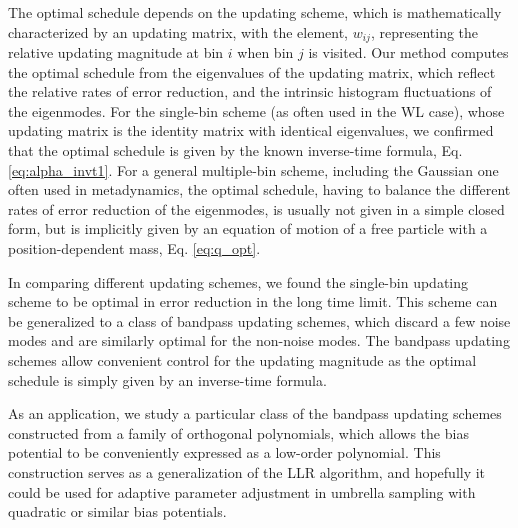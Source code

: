 \documentclass[reprint, superscriptaddress, floatfix]{revtex4-1}
\begin{document}
The optimal schedule depends on the updating scheme,
which is mathematically characterized by an updating matrix,
with the element, $w_{ij}$,
representing the relative updating magnitude
at bin $i$ when bin $j$ is visited.
%
Our method computes the optimal schedule from
the eigenvalues of the updating matrix,
which reflect the relative rates of error reduction,
and the intrinsic histogram fluctuations
of the eigenmodes.
%
For the single-bin scheme (as often used in the WL case),
whose updating matrix is the identity matrix with identical eigenvalues,
we confirmed that the optimal schedule
is given by the known inverse-time formula,
Eq. \eqref{eq:alpha_invt1}.
%
For a general multiple-bin scheme,
including the Gaussian one often used in metadynamics,
the optimal schedule, having to balance
the different rates of error reduction of the eigenmodes,
is usually not given in a simple closed form,
but is implicitly given by an equation of motion
of a free particle with a position-dependent mass,
Eq. \eqref{eq:q_opt}.
%



In comparing different updating schemes,
we found
the single-bin updating scheme to be optimal
in error reduction in the long time limit.
%
This scheme can be generalized to
a class of bandpass updating schemes,
which discard a few noise modes
and are similarly optimal for the non-noise modes.
%
The bandpass updating schemes allow convenient control
for the updating magnitude
as the optimal schedule
is simply given by an inverse-time formula.

As an application,
we study a particular class
of the bandpass updating schemes
constructed from a family of orthogonal polynomials,
which allows the bias potential
to be conveniently expressed as a low-order polynomial.
%
This construction serves as a generalization
of the LLR algorithm\cite{langfeld2012, pellegrini2014},
and hopefully it could be used for
adaptive parameter adjustment
in umbrella sampling with
quadratic\cite{neuhaus2006, *neuhaus2007, zhu2012}
or similar\cite{martin-mayor2007, *sergio2011, *persson2013, kim2010}
bias potentials.
\end{document}
